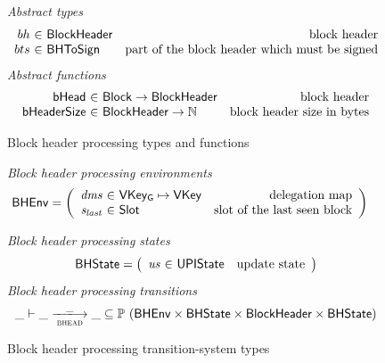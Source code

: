 \documentclass[11pt,a4paper]{article}
\newcommand{\powerset}[1]{\mathbb{P}~#1}
\newcommand{\var}[1]{\mathit{#1}}
\newcommand{\fun}[1]{\mathsf{#1}}
\newcommand{\type}[1]{\mathsf{#1}}
\newcommand{\trans}[2]{\xlongrightarrow[\textsc{#1}]{#2}}
\newcommand{\totalf}{\to}
\newcommand{\Slot}{\type{Slot}}
\newcommand{\Block}{\type{Block}}
\newcommand{\VKey}{\type{VKey}}
\newcommand{\VKeyGen}{\type{VKey_G}}
\newcommand{\bhdrsizename}{bHeaderSize}
\begin{document}
\begin{figure}[ht]
  \emph{Abstract types}
  \begin{equation*}
    \begin{array}{r@{~\in~}lr}
      bh & \Bhead & \text{block header} \\
      bts & \Bhtosign & \text{part of the block header which must be signed}
    \end{array}
  \end{equation*}
  \emph{Abstract functions}
  \begin{equation*}
    \begin{array}{r@{~\in~}lr}
      \fun{\bheadname} & \Block \totalf \Bhead & \text{block header} \\
      \fun{\bhdrsizename} & \Bhead \totalf \mathbb{N} & \text{block header size in bytes}
    \end{array}
  \end{equation*}
  \caption{Block header processing types and functions}
  \label{fig:defs:bhead}
\end{figure}

\begin{figure}[ht]
  \emph{Block header processing environments}
  \begin{align*}
    & \BHEnv
      = \left(
      \begin{array}{r@{~\in~}lr}
        \var{dms} & \VKeyGen \mapsto \VKey & \text{delegation map}\\
        \var{s_{last}} & \Slot & \text{slot of the last seen block}
      \end{array}\right)
  \end{align*}

  \emph{Block header processing states}
  \begin{equation*}
    \BHState =
    \left(
      \begin{array}{r@{~\in~}lr}
        \var{us} & \UPIState & \text{update state}
      \end{array}
    \right)
  \end{equation*}
  \emph{Block header processing transitions}
  \begin{equation*}
    \var{\_} \vdash \var{\_} \trans{bhead}{\_} \var{\_} \subseteq
    \powerset (\BHEnv \times \BHState \times \Bhead \times \BHState)
  \end{equation*}
  \caption{Block header processing transition-system types}
  \label{fig:ts-types:bhead}
\end{figure}
\end{document}
